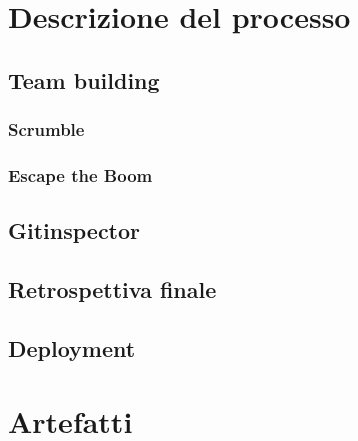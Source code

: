 \documentclass[11pt]{article}
\begin{document}

\newpage
\section{Descrizione del processo}

\subsection{Team building}
\subsubsection{Scrumble}
\subsubsection{Escape the Boom}

\subsection{Gitinspector}

\subsection{Retrospettiva finale}

\subsection{Deployment}


\newpage
\section{Artefatti}
\end{document}
